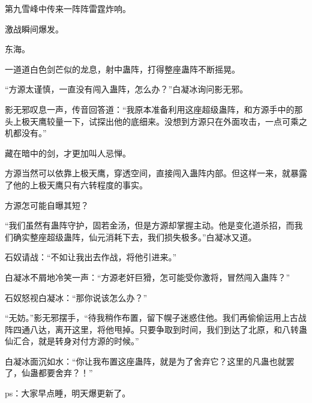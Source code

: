 \begin{this_body}
第九雪峰中传来一阵阵雷霆炸响。

激战瞬间爆发。

东海。

一道道白色剑芒似的龙息，射中蛊阵，打得整座蛊阵不断摇晃。

“方源太谨慎，一直没有闯入蛊阵，怎么办？”白凝冰询问影无邪。

影无邪叹息一声，传音回答道：“我原本准备利用这座超级蛊阵，和方源手中的那头上极天鹰较量一下，试探出他的底细来。没想到方源只在外面攻击，一点可乘之机都没有。”

藏在暗中的剑，才更加叫人忌惮。

方源当然可以依靠上极天鹰，穿透空间，直接闯入蛊阵内部。但这样一来，就暴露了他的上极天鹰只有六转程度的事实。

方源怎可能自曝其短？

“我们虽然有蛊阵守护，固若金汤，但是方源却掌握主动。他是变化道杀招，而我们确实整座超级蛊阵，仙元消耗下去，我们损失极多。”白凝冰又道。

石奴请战：“不如让我出去作战，将他引进来。”

白凝冰不屑地冷笑一声：“方源老奸巨猾，怎可能受你激将，冒然闯入蛊阵？”

石奴怒视白凝冰：“那你说该怎么办？”

“无妨。”影无邪摆手，“待我稍作布置，留下幌子迷惑住他。我们再偷偷运用上古战阵四通八达，离开这里，将他甩掉。只要争取到时间，我们到达了北原，和八转蛊仙汇合，就是转身对付方源的时候。”

白凝冰面沉如水：“你让我布置这座蛊阵，就是为了舍弃它？这里的凡蛊也就罢了，仙蛊都要舍弃？！”

ps：大家早点睡，明天爆更新了。

\end{this_body}

